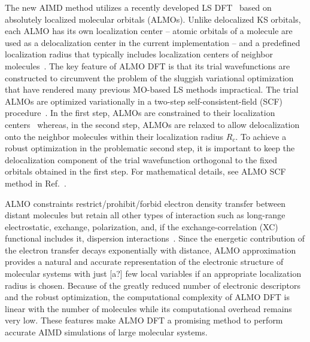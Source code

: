 \documentclass[aps,prl,reprint,amsmath,amssymb]{revtex4-1}
\begin{document}
The new AIMD method utilizes a recently developed LS DFT~\cite{a:almo-ls} based on absolutely localized molecular orbitals (\mbox{ALMOs}). 
Unlike delocalized KS orbitals, each \mbox{ALMO} has its own localization center -- atomic orbitals of a molecule are used as a delocalization center in the current implementation -- and a predefined localization radius that typically includes localization centers of neighbor molecules~\cite{a:stoll,a:almo-ls}. 
The key feature of ALMO DFT is that its trial wavefunctions are constructed to circumvent the problem of the sluggish variational optimization that have rendered many previous MO-based LS methods impractical. 
The trial ALMOs are optimized variationally in a two-step self-consistent-field (SCF) procedure~\cite{a:almo-ls}. 
In the first step, ALMOs are constrained to their localization centers~\cite{a:khal} whereas, in the second step, ALMOs are relaxed to allow delocalization onto the neighbor molecules within their localization radius $R_{c}$. 
To achieve a robust optimization in the problematic second step, it is important to keep the delocalization component of the trial wavefunction orthogonal to the fixed orbitals obtained in the first step. 
For mathematical details, see ALMO SCF method in Ref.~.

ALMO constraints restrict/prohibit/forbid electron density transfer between distant molecules but retain all other types of interaction such as long-range electrostatic, exchange, polarization, and, if the exchange-correlation (XC) functional includes it, dispersion interactions~\cite{a:theeda}. 
Since the energetic contribution of the electron transfer decays exponentially with distance, \mbox{ALMO} approximation provides a natural and accurate representation of the electronic structure of molecular systems with just [a?] few local variables if an appropriate localization radius is chosen. 
Because of the greatly reduced number of electronic descriptors and the robust optimization, the computational complexity of ALMO DFT is linear with the number of molecules while its computational overhead remains very low. These features make ALMO DFT a promising method to perform accurate AIMD simulations of large molecular systems.
\end{document}

